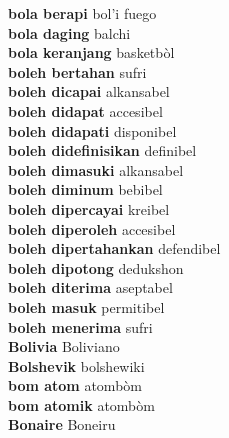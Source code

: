 \textbf{ bola berapi  } bol’i fuego \\
\textbf{ bola daging  } balchi \\
\textbf{ bola keranjang  } basketbòl \\
\textbf{ boleh bertahan  } sufri \\
\textbf{ boleh dicapai  } alkansabel \\
\textbf{ boleh didapat  } accesibel \\
\textbf{ boleh didapati  } disponibel \\
\textbf{ boleh didefinisikan  } definibel \\
\textbf{ boleh dimasuki  } alkansabel \\
\textbf{ boleh diminum  } bebibel \\
\textbf{ boleh dipercayai  } kreibel \\
\textbf{ boleh diperoleh  } accesibel \\
\textbf{ boleh dipertahankan  } defendibel \\
\textbf{ boleh dipotong  } dedukshon \\
\textbf{ boleh diterima  } aseptabel \\
\textbf{ boleh masuk  } permitibel \\
\textbf{ boleh menerima  } sufri \\
\textbf{ Bolivia  } Boliviano \\
\textbf{ Bolshevik  } bolshewiki \\
\textbf{ bom atom  } atombòm \\
\textbf{ bom atomik  } atombòm \\
\textbf{ Bonaire  } Boneiru \\
